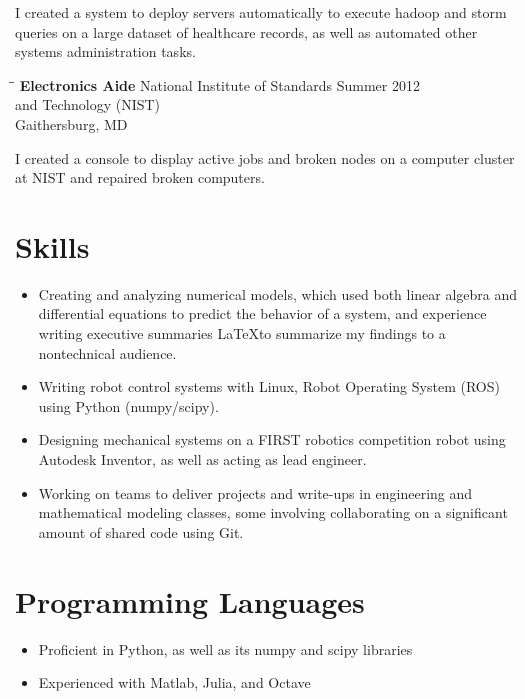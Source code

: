 \documentclass[12pt]{res}
\begin{document}
\begin{resume}
	\noindent
	I created a system to deploy servers automatically to execute
    hadoop and storm queries on a large dataset of healthcare
    records, as well as automated other systems administration tasks.

    \begin{tabbing}
    \hspace{2.3in}\= \hspace{2.6in}\= \kill %
    \textbf{Electronics Aide} \> National Institute of Standards \> Summer 2012\\
						\> and Technology (NIST) \\
                           \> Gaithersburg, MD    
    \end{tabbing}\vspace{-10pt}
	\noindent
      I created a console to display active jobs and broken nodes
      on a computer cluster at NIST and repaired broken computers.

  \section{Skills}
	\noindent
	\begin{itemize}
	\item Creating and analyzing numerical models, which used both 
		linear algebra and differential equations to predict the behavior of a system, 
		and experience writing executive summaries \LaTeX to summarize my findings to a nontechnical audience.
	\item Writing robot control systems with Linux, Robot Operating System
		(ROS) using Python (numpy/scipy).
	\item Designing mechanical systems on a FIRST robotics
		competition robot using Autodesk Inventor, 
		as well as acting as lead engineer.
	\item Working on teams to deliver projects and write-ups
		in engineering and mathematical modeling classes,
		some involving collaborating on a significant amount of shared
		code using Git.
	\end{itemize}

	\section{Programming Languages}
	\noindent
	\begin{itemize}
	\item Proficient in Python, as well as its numpy and scipy libraries
	\item Experienced with Matlab, Julia, and Octave
	\end{itemize}


\end{resume}
\end{document}
